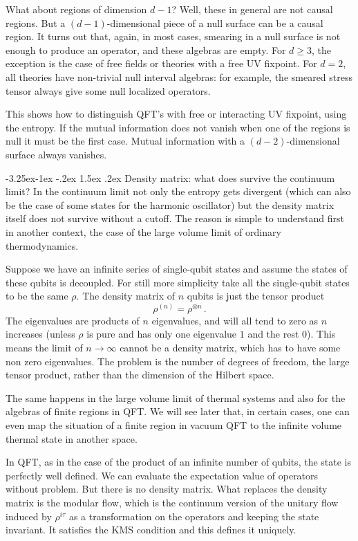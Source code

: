 \documentclass[11pt,a4paper]{article}
\makeatletter
\renewcommand\subsection{\@startsection{subsection}{2}{\z@}%
                                   {-3.25ex\@plus -1ex \@minus -.2ex}%
                                     {1.5ex \@plus .2ex}%
                                     {\normalfont\bfseries}}
\numberwithin{equation}{section}
\newcommand{\be}{\begin{equation}}
\newcommand{\ee}{\end{equation}}
\makeatother
\begin{document}
What about regions of dimension $d-1$? Well, these in general are not causal regions. But a $(d-1)$-dimensional piece of a null surface can be a causal region. It turns out that, again, in most cases, smearing in a null surface is not enough to produce an operator, and these algebras are empty. For $d\ge 3$, the exception is the case of free fields or theories with a free UV fixpoint. For $d=2$, all theories have non-trivial null interval algebras: for example, the smeared stress tensor always give some null localized operators.  

This shows how to distinguish QFT's with free or interacting UV fixpoint, using the entropy. If the mutual information does not vanish when one of the regions is null it must be the first case. Mutual information with a $(d-2)$-dimensional surface always vanishes. 

\subsection{Density matrix: what does survive the continuum limit?}
\label{density}
In the continuum limit not only the entropy gets divergent (which can also be the case of some states for the harmonic oscillator) but the density matrix itself does not survive without a cutoff. The reason is simple to understand first in another context, the case of the large volume limit of ordinary thermodynamics. 

Suppose we have an infinite series of single-qubit states and assume the states of these qubits is decoupled. For still more simplicity take all the single-qubit states to be the same $\rho$. The density matrix of $n$ qubits is just the tensor product
\be
\rho^{(n)}=\rho^{\otimes n}\,. 
\ee
The eigenvalues are products of $n$ eigenvalues, and will all tend to zero as $n$ increases (unless $\rho$ is pure and has only one eigenvalue $1$ and the rest $0$). This means the limit of $n\rightarrow \infty$ cannot be a density matrix, which has to have some non zero eigenvalues. The problem is the number of degrees of freedom, the large tensor product, rather than the dimension of the Hilbert space. 

The same happens in the large volume limit of thermal systems and also for the algebras of finite regions in QFT. We will see later that, in certain cases, one can even map the situation of a finite region in vacuum QFT to the infinite volume thermal state in another space. 

In QFT, as in the case of the product of an infinite number of qubits, the state is perfectly well defined. We can evaluate the expectation value of operators without problem. But there is no density matrix.     
What replaces the density matrix is the modular flow, which is the continuum version of the unitary flow induced by $\rho^{i\tau}$ as a transformation on the operators and keeping the state invariant. It satisfies the KMS condition and this defines it uniquely.  
\end{document}
